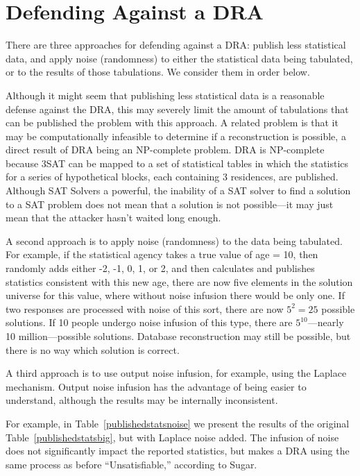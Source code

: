 \documentclass[runningheads]{llncs}
\begin{document}
\section{Defending Against a DRA}
There are three approaches for defending against a DRA: publish less
statistical data, and apply noise (randomness) to either the
statistical data being tabulated, or to the results of those
tabulations. We consider them in order below.

Although it might seem that publishing less statistical data is a
reasonable defense against the DRA, this may severely limit the amount
of tabulations that can be published the problem with this approach. A
related problem is that it may be computationally infeasible to
determine if a reconstruction is possible, a direct result of DRA being an NP-complete
problem. DRA is NP-complete because 3SAT can be mapped to a set of
statistical tables in which the statistics for a series of
hypothetical blocks, each containing 3 residences, are
published. Although SAT Solvers a powerful, the inability of a SAT
solver to find a solution to a SAT problem does not mean that a
solution is not possible---it may just mean that the attacker hasn't waited
long enough. 

A second approach is to apply noise (randomness) to the data being
tabulated. For example, if the statistical agency takes a true
value of age = 10, then randomly adds either -2, -1, 0, 1, or 2, and
then calculates and publishes statistics consistent with this new age,
there are now five elements in the solution universe for this value,
where without noise infusion there would be only one. If two responses
are processed with noise of this sort, there are now $5^2 = 25$
possible solutions. If 10 people undergo noise infusion of this type,
there are $5^{10}$---nearly 10 million---possible
solutions. Database reconstruction may still be possible, but there is no
way which solution is correct. 

A third approach is to use output noise infusion, for example, using
the Laplace mechanism\cite{Dwork:2006:CNS:2180286.2180305}. Output
noise infusion has the advantage of being easier to understand,
although the results may be internally inconsistent. 

For example, in Table~\ref{publishedstatsnoise} we present the results
of the original Table~\ref{publishedstatsbig}, but with Laplace noise
added.  The infusion of noise does not
significantly impact the reported statistics, but makes a DRA using
the same process as before ``Unsatisfiable,'' according to Sugar. 
\end{document}
